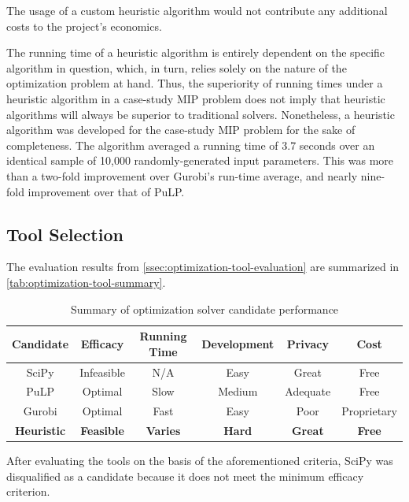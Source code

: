 \documentclass[../mthe-493-final-project.tex]{subfiles}
\begin{document}
    The usage of a custom heuristic algorithm would not contribute any additional costs to the project's economics.
    
    The running time of a heuristic algorithm is entirely dependent on the specific algorithm in question, which, in turn, relies solely on the nature of the optimization problem at hand. Thus, the superiority of running times under a heuristic algorithm in a case-study MIP problem does not imply that heuristic algorithms will always be superior to traditional solvers. Nonetheless, a heuristic algorithm was developed for the case-study MIP problem for the sake of completeness. The algorithm averaged a running time of 3.7 seconds over an identical sample of 10,000 randomly-generated input parameters. This was more than a two-fold improvement over Gurobi's run-time average, and nearly nine-fold improvement over that of PuLP.
    
    \subsection{Tool Selection}
    \label{ssec:optimization-tool-selection}
    
    The evaluation results from \autoref{ssec:optimization-tool-evaluation} are summarized in \autoref{tab:optimization-tool-summary}.
    \begin{table}
        \begin{tabular}{| c || c c c c c |}
            \hline
            Candidate & Efficacy & Running Time & Development & Privacy & Cost \\ [0.5ex] 
            \hline\hline
            SciPy & Infeasible & N/A & Easy & Great & Free \\ 
            \hline
            PuLP & Optimal & Slow & Medium & Adequate & Free \\
            \hline
            Gurobi & Optimal & Fast & Easy & Poor & Proprietary \\
            \hline
            \textbf{Heuristic} & \textbf{Feasible} & \textbf{Varies} & \textbf{Hard} & \textbf{Great} & \textbf{Free} \\
            \hline
        \end{tabular}
        \caption{\label{tab:optimization-tool-summary}Summary of optimization solver candidate performance}
    \end{table}
    After evaluating the tools on the basis of the aforementioned criteria, SciPy was disqualified as a candidate because it does not meet the minimum efficacy criterion.
    
\end{document}
